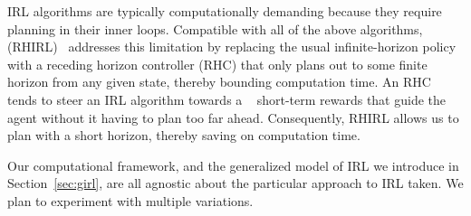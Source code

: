 IRL algorithms are typically computationally demanding because they
require planning in their inner loops.
%
Compatible with all of the above algorithms,  (RHIRL)~\cite{macglashan15b} addresses this limitation by
replacing the usual infinite-horizon policy with a receding horizon
controller (RHC) that only plans out to some finite horizon from any
given state, thereby bounding computation time. An RHC tends to steer
an IRL algorithm towards a ~\cite{Ng:1999:PIU:645528.657613}
short-term rewards that guide the agent without it having to plan too
far ahead.  Consequently, RHIRL allows us to plan with a short
horizon, thereby saving on computation time.

Our computational framework, and the generalized model of IRL we
introduce in Section~\ref{sec:girl}, are all agnostic about the
particular approach to IRL taken.  We plan to experiment with multiple
variations.


